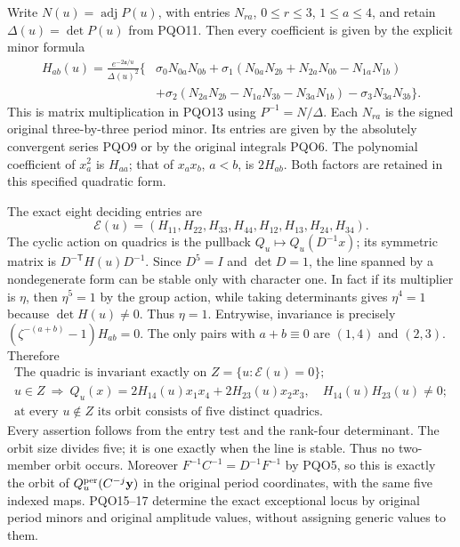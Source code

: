 \documentclass[11pt,a4paper]{article}
\begin{document}
Write $N(u)=\operatorname{adj}P(u)$, with entries $N_{ra}$,
$0\leq r\leq3$, $1\leq a\leq4$, and retain
$\Delta(u)=\det P(u)$ from PQO11. Then every coefficient is
given by the explicit minor formula
\[
\begin{aligned}
 H_{ab}(u)=\frac{e^{-2\mathfrak a/u}}{\Delta(u)^2}
 \{&\sigma_0N_{0a}N_{0b}
 +\sigma_1(N_{0a}N_{2b}+N_{2a}N_{0b}-N_{1a}N_{1b})\\
 &+\sigma_2(N_{2a}N_{2b}-N_{1a}N_{3b}-N_{3a}N_{1b})
                         -\sigma_3N_{3a}N_{3b}\}.
\end{aligned}\tag{PQO15}
\]
This is matrix multiplication in PQO13 using
$P^{-1}=N/\Delta$. Each $N_{ra}$ is the signed original
three-by-three period minor. Its entries are given by the
absolutely convergent series PQO9 or by the original integrals
PQO6. The polynomial coefficient of $x_a^2$ is $H_{aa}$;
that of $x_ax_b$, $a<b$, is $2H_{ab}$. Both factors are
retained in this specified quadratic form.

The exact eight deciding entries are
\[
 \mathcal E(u)=
 (H_{11},H_{22},H_{33},H_{44},H_{12},H_{13},H_{24},H_{34}).
 \tag{PQO16}
\]
The cyclic action on quadrics is the pullback
$Q_u\mapsto Q_u(D^{-1}x)$; its symmetric matrix is
$D^{-\mathsf T}H(u)D^{-1}$. Since $D^5=I$ and $\det D=1$,
the line spanned by a nondegenerate form can be stable only
with character one. In fact if its multiplier is $\eta$, then
$\eta^5=1$ by the group action, while taking determinants
gives $\eta^4=1$ because $\det H(u)\ne0$. Thus $\eta=1$.
Entrywise, invariance is precisely
$(\zeta^{-(a+b)}-1)H_{ab}=0$. The only pairs with
$a+b\equiv0$ are $(1,4)$ and $(2,3)$. Therefore
\[
\boxed{\begin{gathered}
 \text{The quadric is invariant exactly on }
       Z=\{u:\mathcal E(u)=0\};\\
 u\in Z\ \Longrightarrow\
 Q_u(x)=2H_{14}(u)x_1x_4+2H_{23}(u)x_2x_3,
                 \quad H_{14}(u)H_{23}(u)\ne0;\\
 \text{at every }u\notin Z\text{ its orbit consists of five distinct quadrics.}
\end{gathered}}\tag{PQO17}
\]
Every assertion follows from the entry test and the rank-four
determinant. The orbit size divides five; it is one exactly
when the line is stable. Thus no two-member orbit occurs.
Moreover $F^{-1}C^{-1}=D^{-1}F^{-1}$ by PQO5, so this is
exactly the orbit of $Q_u^{\rm per}(C^{-j}\mathbf y)$ in the
original period coordinates, with the same five indexed maps.
PQO15--17 determine the exact exceptional locus by original
period minors and original amplitude values, without assigning
generic values to them.
\end{document}
